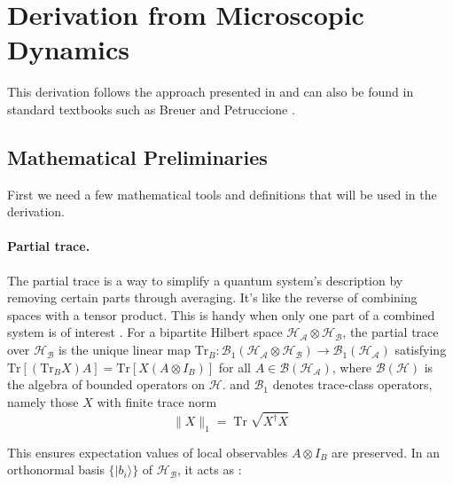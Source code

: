 
\section{Derivation from Microscopic Dynamics}
\label{sec:Derivation_redfield_eq}

\noindent
This derivation follows the approach presented in \cite{manzano2020shortintroductionlindblad} and can also be found in standard textbooks such as Breuer and Petruccione \cite{breuerpetruccione2009theoryopenquantum}. 

\subsection{Mathematical Preliminaries}
\label{subsec:preliminaries_tools}

First we need a few mathematical tools and definitions that will be used in the derivation.
\noindent
\paragraph{Partial trace.}

\noindent
The partial trace is a way to simplify a quantum system's description by removing certain parts through averaging. It's like the reverse of combining spaces with a tensor product. This is handy when only one part of a combined system is of interest \cite{lambertetal2024qutip5quantum}.
For a bipartite Hilbert space $\mathcal{H_A} \otimes \mathcal{H_B}$, the partial trace over $\mathcal{H_B}$ is the unique linear map $\mathrm{Tr}_B: \mathcal{B}_1(\mathcal{H_A} \otimes \mathcal{H_B}) \to \mathcal{B}_1(\mathcal{H_A})$ satisfying $\mathrm{Tr}[(\mathrm{Tr}_B X) A] = \mathrm{Tr}[X (A \otimes I_B)]$ for all $A \in \mathcal{B}(\mathcal{H_A})$, where  $\mathcal{B}(\mathcal{H})$ is the algebra of bounded operators on $\mathcal{H}$.
and $\mathcal{B}_1$ denotes trace-class operators, namely those $X$ with finite trace norm 
\[ 
  \| X \|_1 = \operatorname{Tr} \sqrt{X^\dagger X} 
\]

\noindent
This ensures expectation values of local observables $A \otimes I_B$ are preserved. In an orthonormal basis $\{|b_i\rangle\}$ of $\mathcal{H_B}$, it acts as \cite{steebhardy2018problemssolutionsquantum}:

